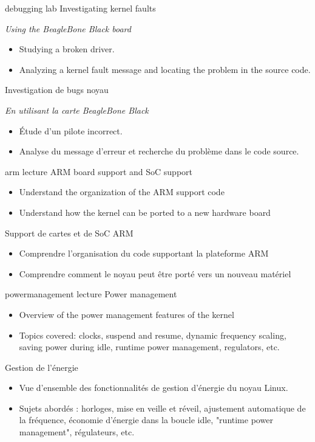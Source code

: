 {debugging}
{lab}
{Investigating kernel faults}
{
  {\em Using the BeagleBone Black board}
  \begin{itemize}
  \item Studying a broken driver.
  \item Analyzing a kernel fault message and locating the problem in the
    source code.
  \end{itemize}
}
{Investigation de bugs noyau}
{
  {\em En utilisant la carte BeagleBone Black}
  \begin{itemize}
  \item Étude d'un pilote incorrect.
  \item Analyse du message d'erreur et recherche du problème dans le code
    source.
  \end{itemize}
}
{arm}
{lecture}
{ARM board support and SoC support}
{
  \begin{itemize}
  \item Understand the organization of the ARM support code
  \item Understand how the kernel can be ported to a new hardware
    board
  \end{itemize}
}
{Support de cartes et de SoC ARM}
{
  \begin{itemize}
  \item Comprendre l'organisation du code supportant la plateforme ARM
  \item Comprendre comment le noyau peut être porté vers un nouveau
    matériel
  \end{itemize}
}
{powermanagement}
{lecture}
{Power management}
{
  \begin{itemize}
  \item Overview of the power management features of the kernel
  \item Topics covered: clocks, suspend and resume, dynamic frequency
    scaling, saving power during idle, runtime power management,
    regulators, etc.
  \end{itemize}
}
{Gestion de l'énergie}
{
  \begin{itemize}
  \item Vue d'ensemble des fonctionnalités de gestion d'énergie du noyau
    Linux.
  \item Sujets abordés : horloges, mise en veille et réveil, ajustement
    automatique de la fréquence, économie d'énergie dans la boucle idle,
    "runtime power management", régulateurs, etc.
  \end{itemize}
}
